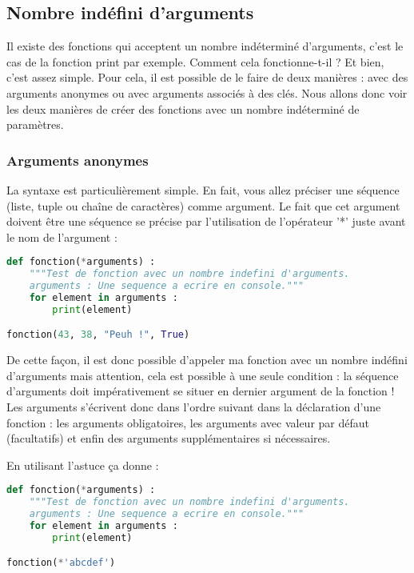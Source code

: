\documentclass[a4paper,twoside]{article}
\begin{document}
\subsection{Nombre indéfini d'arguments}

Il existe des fonctions qui acceptent un nombre indéterminé d'arguments, c'est le cas de la fonction print par exemple. Comment cela fonctionne-t-il ? Et bien, c'est assez simple. Pour cela, il est possible de le faire de deux manières : avec des arguments anonymes ou avec arguments associés à des clés. Nous allons donc voir les deux manières de créer des fonctions avec un nombre indéterminé de paramètres.

\subsubsection{Arguments anonymes}

La syntaxe est particulièrement simple. En fait, vous allez préciser une séquence (liste, tuple ou chaîne de caractères) comme argument. Le fait que cet argument doivent être une séquence se précise par l'utilisation de l'opérateur '*' juste avant le nom de l'argument :

\begin{lstlisting}[language=python]
def fonction(*arguments) :
    """Test de fonction avec un nombre indefini d'arguments.
    arguments : Une sequence a ecrire en console."""
    for element in arguments :
        print(element)

fonction(43, 38, "Peuh !", True)
\end{lstlisting}

De cette façon, il est donc possible d'appeler ma fonction avec un nombre indéfini d'arguments mais attention, cela est possible à une seule condition : la séquence d'arguments doit impérativement se situer en dernier argument de la fonction ! Les arguments s'écrivent donc dans l'ordre suivant dans la déclaration d'une fonction : les arguments obligatoires, les arguments avec valeur par défaut (facultatifs) et enfin des arguments supplémentaires si nécessaires.

En utilisant l'astuce  ça donne :
\begin{lstlisting}[language=python]
def fonction(*arguments) :
    """Test de fonction avec un nombre indefini d'arguments.
    arguments : Une sequence a ecrire en console."""
    for element in arguments :
        print(element)

fonction(*'abcdef')
\end{lstlisting}
\end{document}
